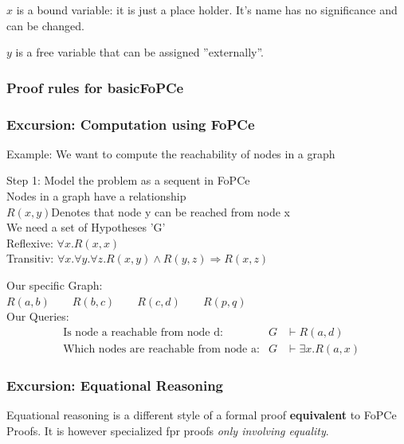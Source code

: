 $x$ is a bound variable: it is just a place holder. It's name has no significance and can be changed.

$y$ is a free variable that can be assigned ''externally''.

\subsubsection{Proof rules for basicFoPCe}


\subsubsection{Excursion: Computation using FoPCe}
Example: We want to compute the reachability of nodes in a graph %

Step 1: Model the problem as a sequent in FoPCe \\

Nodes in a graph have a relationship \\
$R(x,y)$\qquad Denotes that node y can be reached from node x\\

We need a set of Hypotheses 'G' \\
Reflexive: $\forall x. R(x,x)$ \\
Transitiv: $\forall x.\forall y.\forall z. R(x,y) \land R(y,z) \Rightarrow R(x,z)$

Our specific Graph:\\
$R(a,b) \qquad R(b,c) \qquad R(c,d) \qquad R(p,q)$\\

Our Queries: \\
\begin{align*}
	&\text{Is node a reachable from node d:} &G &\vdash R(a,d)\\
	&\text{Which nodes are reachable from node a:} &G &\vdash \exists x.R(a,x)
\end{align*}

\subsubsection{Excursion: Equational Reasoning}
Equational reasoning is a different style of a formal proof \textbf{equivalent} to FoPCe Proofs. It is however specialized fpr proofs \emph{only involving equality}.

